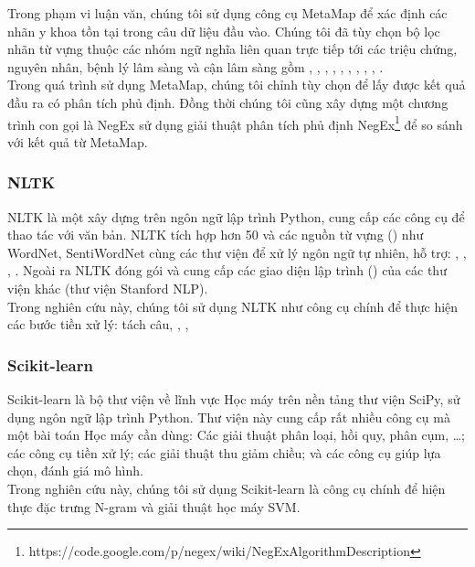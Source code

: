 Trong phạm vi luận văn, chúng tôi sử dụng công cụ MetaMap để xác định các nhãn y khoa tồn tại trong câu dữ liệu đầu vào. Chúng tôi đã tùy chọn bộ lọc nhãn từ vựng thuộc các nhóm ngữ nghĩa liên quan trực tiếp tới các triệu chứng, nguyên nhân, bệnh lý lâm sàng và cận lâm sàng gồm , , , , , , , , , .\\

Trong quá trình sử dụng MetaMap, chúng tôi chỉnh tùy chọn  để lấy được kết quả đầu ra có phân tích phủ định. Đồng thời chúng tôi cũng xây dựng một chương trình con gọi là NegEx sử dụng giải thuật phân tích phủ định NegEx\footnote{https://code.google.com/p/negex/wiki/NegExAlgorithmDescription} để so sánh với kết quả từ MetaMap.

\subsubsection*{NLTK}
NLTK \cite{bird2009natural} là một  xây dựng trên ngôn ngữ lập trình Python, cung cấp các công cụ để thao tác với văn bản. NLTK tích hợp hơn 50  và các nguồn từ vựng () như WordNet, SentiWordNet cùng các thư viện để xử lý ngôn ngữ tự nhiên, hỗ trợ: , , , . Ngoài ra NLTK đóng gói và cung cấp các giao diện lập trình () của các thư viện khác (thư viện Stanford NLP).\\

Trong nghiên cứu này, chúng tôi sử dụng NLTK như công cụ chính để thực hiện các bước tiền xử lý: tách câu, , , 
\subsubsection*{Scikit-learn}
Scikit-learn \cite{scikit-learn} là bộ thư viện về lĩnh vực Học máy trên nền tảng thư viện SciPy, sử dụng ngôn ngữ lập trình Python. Thư viện này cung cấp rất nhiều công cụ mà một bài toán Học máy cần dùng: Các giải thuật phân loại, hồi quy, phân cụm, \ldots; các công cụ tiền xử lý; các giải thuật thu giảm chiều; và các công cụ giúp lựa chọn, đánh giá mô hình.\\

Trong nghiên cứu này, chúng tôi sử dụng Scikit-learn là công cụ chính để hiện thực đặc trưng N-gram và giải thuật học máy SVM.


